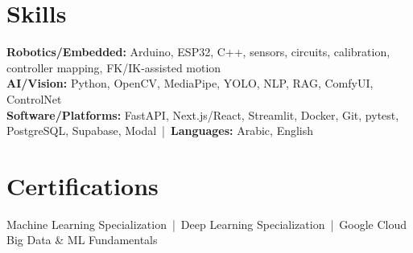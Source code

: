 \documentclass[letterpaper]{article}
\begin{document}
\section*{Skills}
\textbf{Robotics/Embedded:} Arduino, ESP32, C++, sensors, circuits, calibration, controller mapping, FK/IK-assisted motion\\
\textbf{AI/Vision:} Python, OpenCV, MediaPipe, YOLO, NLP, RAG, ComfyUI, ControlNet\\
\textbf{Software/Platforms:} FastAPI, Next.js/React, Streamlit, Docker, Git, pytest, PostgreSQL, Supabase, Modal \,|\, \textbf{Languages:} Arabic, English

\section*{Certifications}
Machine Learning Specialization \,|\, Deep Learning Specialization \,|\, Google Cloud Big Data \& ML Fundamentals
\end{document}
